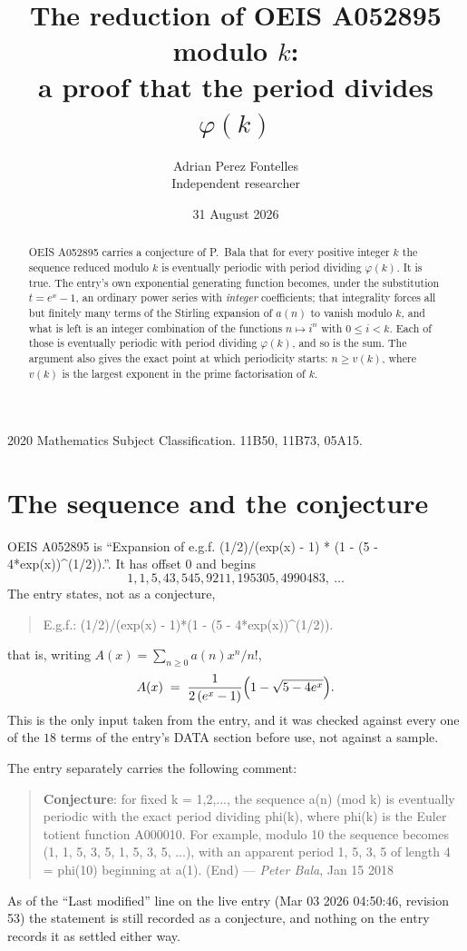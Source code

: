 \documentclass[11pt,a4paper]{article}
\title{The reduction of OEIS A052895 modulo $k$:\\ a proof that the period divides
$\varphi(k)$}
\author{Adrian Perez Fontelles\\ \small Independent researcher}
\date{31 August 2026}
\theoremstyle{plain}
\theoremstyle{definition}
\begin{document}
\maketitle

\begin{abstract}
OEIS A052895 carries a conjecture of P.~Bala that for every positive integer $k$ the
sequence reduced modulo $k$ is eventually periodic with period dividing $\varphi(k)$.
It is true. The entry's own exponential generating function becomes, under the
substitution $t=e^{x}-1$, an ordinary power series with \emph{integer} coefficients;
that integrality forces all but finitely many terms of the Stirling expansion of $a(n)$
to vanish modulo $k$, and what is left is an integer combination of the functions
$n\mapsto i^{n}$ with $0\le i<k$. Each of those is eventually periodic with period
dividing $\varphi(k)$, and so is the sum. The argument also gives the exact point at
which periodicity starts: $n\ge v(k)$, where $v(k)$ is the largest exponent in the
prime factorisation of $k$.
\end{abstract}

\noindent\small 2020 Mathematics Subject Classification. 11B50, 11B73, 05A15.\normalsize

\section{The sequence and the conjecture}

OEIS A052895 is ``Expansion of e.g.f. (1/2)/(exp(x) - 1) * (1 - (5 - 4*exp(x))\^{}(1/2)).''. It has offset $0$ and begins
\[
1, 1, 5, 43, 545, 9211, 195305, 4990483,\ \dots
\]
The entry states, not as a conjecture,
\begin{quote}\small
E.g.f.: (1/2)/(exp(x) - 1)*(1 - (5 - 4*exp(x))\^{}(1/2)).
\end{quote}
that is, writing $A(x)=\sum_{n\ge 0}a(n)x^{n}/n!$,
\begin{equation}\label{eq:egf}
A(x)\;=\;\frac{1}{2\,(e^{x}-1)}\Bigl(1-\sqrt{5-4e^{x}}\Bigr).
\end{equation}
This is the only input taken from the entry, and it was checked against every one of the
$18$ terms of the entry's DATA section before use, not against a sample.

The entry separately carries the following comment:
\begin{quote}\small
\textbf{Conjecture}: for fixed k = 1,2,..., the sequence a(n) (mod k) is eventually periodic with the exact period dividing phi(k), where phi(k) is the Euler totient function A000010. For example, modulo 10 the sequence becomes (1, 1, 5, 3, 5, 1, 5, 3, 5, ...), with an apparent period 1, 5, 3, 5 of length 4 = phi(10) beginning at a(1). (End) --- \emph{Peter Bala}, Jan 15 2018
\end{quote}
As of the ``Last modified'' line on the live entry (Mar 03 2026 04:50:46, revision
53) the statement is still recorded as a conjecture, and nothing on the entry
records it as settled either way.
\end{document}
